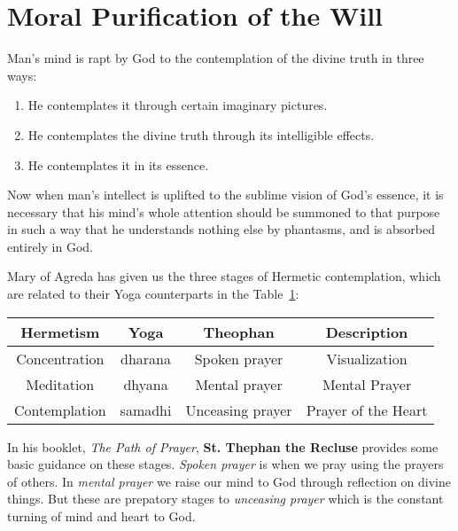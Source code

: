 \section{Moral Purification of the Will}

\begin{quotex}
Man's mind is rapt by God to the contemplation of the divine truth in three ways:

\begin{enumerate}
\item He contemplates it through certain imaginary pictures. 
\item He contemplates the divine truth through its intelligible effects. 
\item He contemplates it in its essence. 
\end{enumerate}

Now when man's intellect is uplifted to the sublime vision of God's essence, it is necessary that his mind's whole attention should be summoned to that purpose in such a way that he understands nothing else by phantasms, and is absorbed entirely in God. 


\end{quotex}

Mary of Agreda has given us the three stages of Hermetic contemplation, which are related to their Yoga counterparts in the Table~\ref{tab:PurificationWill}:

\begin{table}[h]
\label{tab:PurificationWill}
\begin{tabular}{cccc}
\toprule
\textbf{Hermetism} &
\textbf{Yoga} &
\textbf{Theophan} &
\textbf{Description}\\\midrule
Concentration &
dharana &
Spoken prayer &
Visualization\\
Meditation &
dhyana &
Mental prayer &
Mental Prayer\\
Contemplation &
samadhi &
Unceasing prayer &
Prayer of the Heart\\\bottomrule
\end{tabular}
\end{table}


In his booklet, \emph{The Path of Prayer}, \textbf{St. Thephan the Recluse} provides some basic guidance on these stages. \emph{Spoken prayer} is when we pray using the prayers of others. In \emph{mental prayer} we raise our mind to God through reflection on divine things. But these are prepatory stages to \emph{unceasing prayer} which is the constant turning of mind and heart to God.

